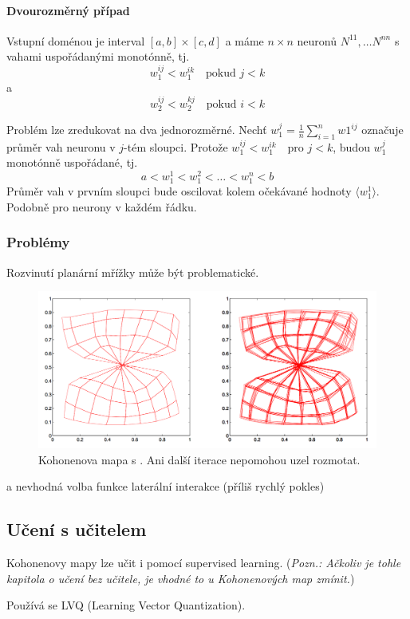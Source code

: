 \documentclass[11pt]{report} %
\numberwithin{equation}{section}
\begin{document}
\paragraph{Dvourozměrný případ}
Vstupní doménou je interval $[a,b] \times [c,d]$ a máme $n\times n$ neuronů $N^{11},\dots N^{nn}$ s vahami uspořádanými monotónně, tj. 
$$w_1^{ij} < w_1^{ik}\quad \text{pokud } j < k $$
a
$$w_2^{ij} < w_2^{kj}\quad \text{pokud } i < k $$

Problém lze zredukovat na dva jednorozměrné. Nechť $w_1^j = \frac{1}{n}\sum_{i=1}^{n}w1^{ij}$ označuje průměr vah neuronu v $j$-tém sloupci. Protože $w_1^{ij} < w_1^{ik}\quad \text{pro } j < k $, budou $w_1^j$ monotónně uspořádané, tj.
$$a < w_1^1 < w_1^2 < \dots < w_1^n < b$$
Průměr vah v prvním sloupci bude oscilovat kolem očekávané hodnoty $\langle w_1^1\rangle$. Podobně pro neurony v každém řádku.

\subsubsection{Problémy}
Rozvinutí planární mřížky může být problematické.
\begin{figure}[h]
	\centering
	\includegraphics[scale=0.7]{img/kohonen_knot.png}
	\caption{Kohonenova mapa s . Ani další iterace nepomohou uzel rozmotat.}
\end{figure}

 a nevhodná volba funkce laterální interakce (příliš rychlý pokles)


\subsection{Učení s učitelem}
Kohonenovy mapy lze učit i pomocí supervised learning. (\textit{Pozn.: Ačkoliv je tohle kapitola o učení bez učitele, je vhodné to u Kohonenových map zmínit.})

Používá se LVQ (Learning Vector Quantization).
\end{document}
